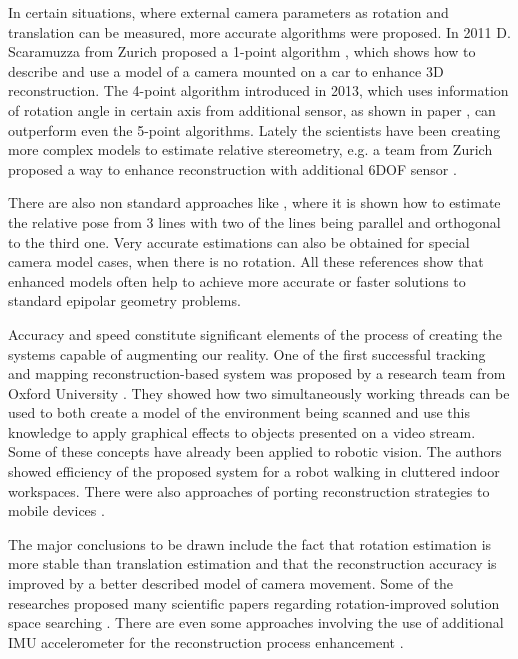 In certain situations, where external camera parameters as rotation and translation can be measured, more accurate algorithms were proposed.  In 2011 D. Scaramuzza from Zurich proposed a 1-point algorithm \cite{1point}, which shows how to describe and use a model of a camera mounted on a car to enhance 3D reconstruction. The 4-point algorithm introduced in 2013, which uses information of rotation angle in certain axis from additional sensor, as shown in paper \cite{4point}, can outperform even the 5-point algorithms. Lately the scientists have been creating more complex models to estimate relative stereometry, e.g. a team from Zurich proposed a way to enhance reconstruction with additional 6DOF sensor \cite{robustCameraImu}.

There are also non standard approaches like \cite{lineBasedPose}, where it is shown how to estimate the relative pose from 3 lines with two of the lines being parallel and orthogonal to the third one. Very accurate estimations can also be obtained for special camera model cases, when there is no rotation\cite{pureTransl}. All these references show that enhanced models often help to achieve more accurate or faster solutions to standard epipolar geometry problems.

Accuracy and speed constitute significant elements of the process of creating the systems capable of augmenting our reality. One of the first successful tracking and mapping reconstruction-based system was proposed by a research team from Oxford University \cite{ptam}. They showed how two simultaneously working threads can be used to both create a model of the environment being scanned and use this knowledge to apply graphical effects to objects presented on a video stream. Some of these concepts have already been applied to robotic vision. The authors showed efficiency of the proposed system for a robot walking in cluttered indoor workspaces\cite{monoSlam}. There were also approaches of porting reconstruction strategies to mobile devices\cite{simultanousRecLocMap} \cite{distributedAR} \cite{combinedMonoSlam} \cite{homographyMobile}.

The major conclusions to be drawn include the fact that rotation estimation is more stable than translation estimation and that the reconstruction accuracy is improved by a better described model of camera movement. Some of the researches proposed many scientific papers regarding rotation-improved solution space searching \cite{rotationSpaceSearch} \cite{Enqvist10stablestructure}. There are even some approaches involving the use of additional IMU accelerometer for the reconstruction process enhancement \cite{robustCameraImu}.


